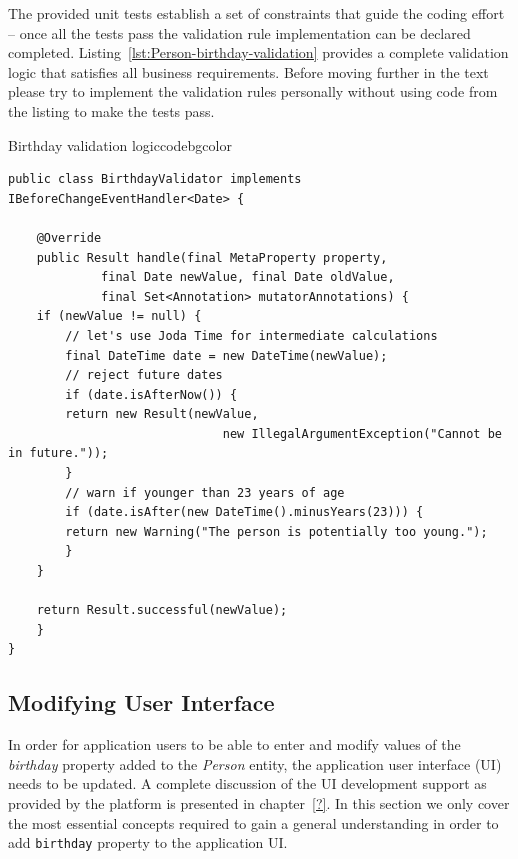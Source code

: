   The provided unit tests establish a set of constraints that guide the coding effort -- once all the tests pass the validation rule implementation can be declared completed.
  Listing~\ref{lst:Person-birthday-validation} provides a complete validation logic that satisfies all business requirements.
  Before moving further in the text please try to implement the validation rules personally without using code from the listing to make the tests pass.


 \begin{code}{Birthday validation logic}{\label{lst:Person-birthday-validation}}{codebgcolor}
    \begin{lstlisting}
public class BirthdayValidator implements IBeforeChangeEventHandler<Date> {

    @Override
    public Result handle(final MetaProperty property, 
			 final Date newValue, final Date oldValue, 
			 final Set<Annotation> mutatorAnnotations) {
	if (newValue != null) {
	    // let's use Joda Time for intermediate calculations
	    final DateTime date = new DateTime(newValue);
	    // reject future dates 
	    if (date.isAfterNow()) {
		return new Result(newValue, 
	                          new IllegalArgumentException("Cannot be in future."));
	    }
	    // warn if younger than 23 years of age 
	    if (date.isAfter(new DateTime().minusYears(23))) {
		return new Warning("The person is potentially too young.");
	    }
	}	
	
	return Result.successful(newValue);
    }
}
    \end{lstlisting}
  \end{code}

\subsection{Modifying User Interface}
  In order for application users to be able to enter and modify values of the \emph{birthday} property added to the \emph{Person} entity, the application user interface (UI) needs to be updated.
  A complete discussion of the UI development support as provided by the platform is presented in chapter~\ref{?}.
  In this section we only cover the most essential concepts required to gain a general understanding in order to add \texttt{birthday} property to the application UI.

